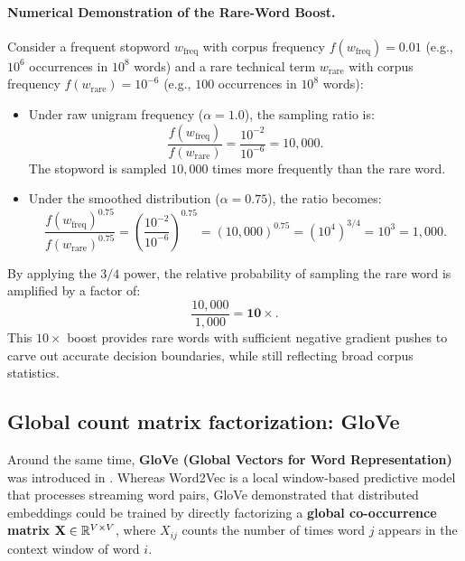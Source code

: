 \documentclass[../../main.tex]{subfiles}
\begin{document}
\paragraph{Numerical Demonstration of the Rare-Word Boost.}
Consider a frequent stopword $w_{\text{freq}}$ with corpus frequency $f(w_{\text{freq}}) = 0.01$ (e.g., $10^6$ occurrences in $10^8$ words) and a rare technical term $w_{\text{rare}}$ with corpus frequency $f(w_{\text{rare}}) = 10^{-6}$ (e.g., $100$ occurrences in $10^8$ words):
\begin{itemize}
    \item Under raw unigram frequency ($\alpha = 1.0$), the sampling ratio is:
    \begin{equation}
    \label{eq:ratio_raw}
    \frac{f(w_{\text{freq}})}{f(w_{\text{rare}})} = \frac{10^{-2}}{10^{-6}} = 10{,}000.
    \end{equation}
    The stopword is sampled $10{,}000$ times more frequently than the rare word.
    
    \item Under the smoothed distribution ($\alpha = 0.75$), the ratio becomes:
    \begin{equation}
    \label{eq:ratio_smoothed}
    \frac{f(w_{\text{freq}})^{0.75}}{f(w_{\text{rare}})^{0.75}} = \left( \frac{10^{-2}}{10^{-6}} \right)^{0.75} = (10{,}000)^{0.75} = (10^4)^{3/4} = 10^3 = 1{,}000.
    \end{equation}
\end{itemize}
By applying the $3/4$ power, the relative probability of sampling the rare word is amplified by a factor of:
\begin{equation}
\label{eq:boost_factor}
\frac{10{,}000}{1{,}000} = \mathbf{10\times}.
\end{equation}
This $10\times$ boost provides rare words with sufficient negative gradient pushes to carve out accurate decision boundaries, while still reflecting broad corpus statistics.

\subsection{Global count matrix factorization: GloVe}
\label{subsec:glove_comparison}

Around the same time, \textbf{GloVe (Global Vectors for Word Representation)} was introduced in \cite{pennington2014glove}. Whereas Word2Vec is a local window-based predictive model that processes streaming word pairs, GloVe demonstrated that distributed embeddings could be trained by directly factorizing a \textbf{global co-occurrence matrix} $\mathbf{X} \in \mathbb{R}^{V \times V}$, where $X_{ij}$ counts the number of times word $j$ appears in the context window of word $i$.
\end{document}
